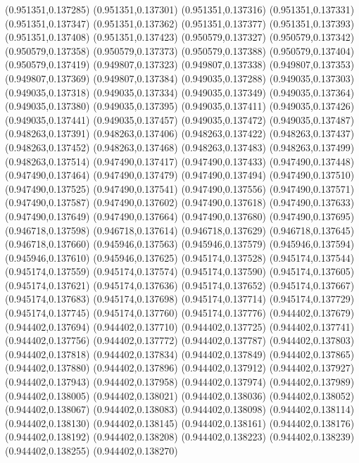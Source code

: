 (0.951351,0.137285)
(0.951351,0.137301)
(0.951351,0.137316)
(0.951351,0.137331)
(0.951351,0.137347)
(0.951351,0.137362)
(0.951351,0.137377)
(0.951351,0.137393)
(0.951351,0.137408)
(0.951351,0.137423)
(0.950579,0.137327)
(0.950579,0.137342)
(0.950579,0.137358)
(0.950579,0.137373)
(0.950579,0.137388)
(0.950579,0.137404)
(0.950579,0.137419)
(0.949807,0.137323)
(0.949807,0.137338)
(0.949807,0.137353)
(0.949807,0.137369)
(0.949807,0.137384)
(0.949035,0.137288)
(0.949035,0.137303)
(0.949035,0.137318)
(0.949035,0.137334)
(0.949035,0.137349)
(0.949035,0.137364)
(0.949035,0.137380)
(0.949035,0.137395)
(0.949035,0.137411)
(0.949035,0.137426)
(0.949035,0.137441)
(0.949035,0.137457)
(0.949035,0.137472)
(0.949035,0.137487)
(0.948263,0.137391)
(0.948263,0.137406)
(0.948263,0.137422)
(0.948263,0.137437)
(0.948263,0.137452)
(0.948263,0.137468)
(0.948263,0.137483)
(0.948263,0.137499)
(0.948263,0.137514)
(0.947490,0.137417)
(0.947490,0.137433)
(0.947490,0.137448)
(0.947490,0.137464)
(0.947490,0.137479)
(0.947490,0.137494)
(0.947490,0.137510)
(0.947490,0.137525)
(0.947490,0.137541)
(0.947490,0.137556)
(0.947490,0.137571)
(0.947490,0.137587)
(0.947490,0.137602)
(0.947490,0.137618)
(0.947490,0.137633)
(0.947490,0.137649)
(0.947490,0.137664)
(0.947490,0.137680)
(0.947490,0.137695)
(0.946718,0.137598)
(0.946718,0.137614)
(0.946718,0.137629)
(0.946718,0.137645)
(0.946718,0.137660)
(0.945946,0.137563)
(0.945946,0.137579)
(0.945946,0.137594)
(0.945946,0.137610)
(0.945946,0.137625)
(0.945174,0.137528)
(0.945174,0.137544)
(0.945174,0.137559)
(0.945174,0.137574)
(0.945174,0.137590)
(0.945174,0.137605)
(0.945174,0.137621)
(0.945174,0.137636)
(0.945174,0.137652)
(0.945174,0.137667)
(0.945174,0.137683)
(0.945174,0.137698)
(0.945174,0.137714)
(0.945174,0.137729)
(0.945174,0.137745)
(0.945174,0.137760)
(0.945174,0.137776)
(0.944402,0.137679)
(0.944402,0.137694)
(0.944402,0.137710)
(0.944402,0.137725)
(0.944402,0.137741)
(0.944402,0.137756)
(0.944402,0.137772)
(0.944402,0.137787)
(0.944402,0.137803)
(0.944402,0.137818)
(0.944402,0.137834)
(0.944402,0.137849)
(0.944402,0.137865)
(0.944402,0.137880)
(0.944402,0.137896)
(0.944402,0.137912)
(0.944402,0.137927)
(0.944402,0.137943)
(0.944402,0.137958)
(0.944402,0.137974)
(0.944402,0.137989)
(0.944402,0.138005)
(0.944402,0.138021)
(0.944402,0.138036)
(0.944402,0.138052)
(0.944402,0.138067)
(0.944402,0.138083)
(0.944402,0.138098)
(0.944402,0.138114)
(0.944402,0.138130)
(0.944402,0.138145)
(0.944402,0.138161)
(0.944402,0.138176)
(0.944402,0.138192)
(0.944402,0.138208)
(0.944402,0.138223)
(0.944402,0.138239)
(0.944402,0.138255)
(0.944402,0.138270)
